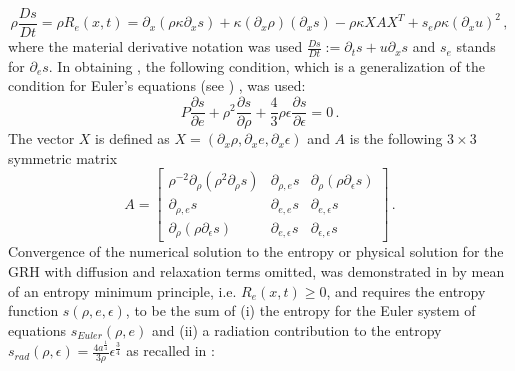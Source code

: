 \documentclass[times,doublespace]{fldauth}%
\begin{document}
\begin{equation} \label{eq:app_entr_eq_non_equil}
\rho \frac{Ds}{Dt} = \rho R_e(x,t) = \partial_x \left( \rho \kappa \partial_x s \right) + \kappa \left(\partial_x \rho\right) \left( \partial_x s\right) - \rho \kappa X A X^T  + s_e \rho \kappa (\partial_x u)^2 \, ,
\end{equation} 
% 
where the material derivative notation was used $\frac{Ds}{Dt} := \partial_t s + u \partial_x s$ and
$s_e$ stands for $\partial_e s$. 
In obtaining , the following condition, which is a generalization of the condition
for Euler's equations (see \cite{our_jcp_radhy_paper}) , was used:
%
\begin{equation} 
\label{eq:visc_reg_assumptions}
P \frac{\partial s}{\partial e} + \rho^2 \frac{\partial s}{\partial \rho} + \frac{4}{3} \rho \epsilon \frac{\partial s}{\partial \epsilon} = 0 \,. 
\end{equation}
%
The vector $X$ is defined as $X=\left( \partial_x \rho, \partial_x e, \partial_x \epsilon \right)$ and $A$ is the 
following $3 \times 3$ symmetric matrix
%
 \begin{equation}\label{eq:mat-quad-form}
 A = 
\begin{bmatrix}
\rho^{-2}\partial_{\rho} \left( \rho^2 \partial_{\rho} s \right) & \partial_{\rho,e} s & \partial_{\rho} \left( \rho \partial_{\epsilon} s \right) \\
 \partial_{\rho,e} s & \partial_{e,e} s & \partial_{e,\epsilon} s \\
 \partial_{\rho} \left( \rho \partial_{\epsilon} s \right) & \partial_{e,\epsilon} s & \partial_{\epsilon,\epsilon} s
\end{bmatrix}
\,.
\end{equation}
%
Convergence of the numerical solution to the entropy or physical solution for the GRH with diffusion and relaxation terms omitted, was demonstrated in \cite{our_jcp_radhy_paper} by mean of an entropy minimum principle, i.e. $R_e(x,t) \geq 0$, and requires the entropy function $s(\rho,e,\epsilon)$, to be the sum of (i) the entropy for the Euler system of equations 
$s_{Euler}(\rho, e)$ and (ii) a radiation contribution to the entropy $s_{rad}(\rho,\epsilon)=\tfrac{4 a^\frac{1}{4}}{3\rho} \epsilon^\frac{3}{4}$ as recalled in : 
\end{document}
